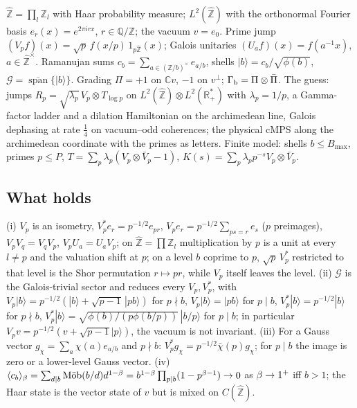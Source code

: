 \begin{definition}
\label{def:phase-side-guess}
$\hat{\mathbb Z} = \prod_{l}\mathbb Z_{l}$ with Haar probability measure; $L^2(\hat{\mathbb Z})$ with
the orthonormal Fourier basis $e_r(x) = e^{2\pi irx}$, $r\in\mathbb Q/\mathbb Z$; the vacuum $v = e_0$.
Prime jump $(V_pf)(x) = \sqrt p\,f(x/p)\,1_{p\hat{\mathbb Z}}(x)$; Galois unitaries
$(U_af)(x) = f(a^{-1}x)$, $a\in\hat{\mathbb Z}^\times$. Ramanujan sums $c_b = \sum_{a\in(\mathbb Z/b)^\times}
e_{a/b}$, shells $|b\rangle = c_b/\sqrt{\phi(b)}$, $\mathcal G = \overline{\operatorname{span}}\{|b\rangle\}$.
Grading $\Pi = +1$ on $\mathbb Cv$, $-1$ on $v^\perp$; $\Gamma_{\mathrm b} = \Pi\otimes\bar\Pi$. The guess: jumps
$R_p = \sqrt{\lambda_p}\,V_p\otimes T_{\log p}$ on $L^2(\hat{\mathbb Z})\otimes L^2(\mathbb R_+^*)$ with
$\lambda_p = 1/p$, a Gamma-factor ladder and a dilation Hamiltonian on the archimedean line, Galois
dephasing at rate $\tfrac14$ on vacuum--odd coherences; the physical cMPS along the archimedean
coordinate with the primes as letters. Finite model: shells $b\le B_{\max}$, primes $p\le P$,
$T = \sum_p\lambda_p(V_p\otimes\bar V_p - 1)$, $K(s) = \sum_p\lambda_pp^{-s}V_p\otimes\bar V_p$.
\end{definition}

\subsection{What holds}

\begin{proposition}
\label{prop:phase-jumps-shells}
(i) $V_p$ is an isometry, $V_p^*e_r = p^{-1/2}e_{pr}$, $V_pe_r = p^{-1/2}\sum_{ps = r}e_s$ ($p$ preimages),
$V_pV_q = V_qV_p$, $V_pU_a = U_aV_p$; on $\hat{\mathbb Z} = \prod\mathbb Z_l$ multiplication by $p$ is a unit at
every $l\ne p$ and the valuation shift at $p$; on a level $b$ coprime to $p$, $\sqrt p\,V_p^*$ restricted
to that level is the Shor permutation $r\mapsto pr$, while $V_p$ itself leaves the level. (ii) $\mathcal G$
is the Galois-trivial sector and reduces every $V_p, V_p^*$, with $V_p|b\rangle = p^{-1/2}(|b\rangle +
\sqrt{p-1}\,|pb\rangle)$ for $p\nmid b$, $V_p|b\rangle = |pb\rangle$ for $p\mid b$, $V_p^*|b\rangle =
p^{-1/2}|b\rangle$ for $p\nmid b$, $V_p^*|b\rangle = \sqrt{\phi(b)/(p\phi(b/p))}\,|b/p\rangle$ for
$p\mid b$; in particular $V_pv = p^{-1/2}(v + \sqrt{p-1}|p\rangle)$, the vacuum is not invariant.
(iii) For a Gauss vector $g_\chi = \sum_a\chi(a)e_{a/b}$ and $p\nmid b$: $V_p^*g_\chi = p^{-1/2}\bar\chi(p)g_\chi$;
for $p\mid b$ the image is zero or a lower-level Gauss vector. (iv) $\langle c_b\rangle_\beta =
\sum_{d\mid b}\operatorname{M\ddot ob}(b/d)d^{1-\beta} = b^{1-\beta}\prod_{p\mid b}(1-p^{\beta-1})\to0$ as
$\beta\to1^+$ iff $b>1$; the Haar state is the vector state of $v$ but is mixed on $C(\hat{\mathbb Z})$.
\end{proposition}

